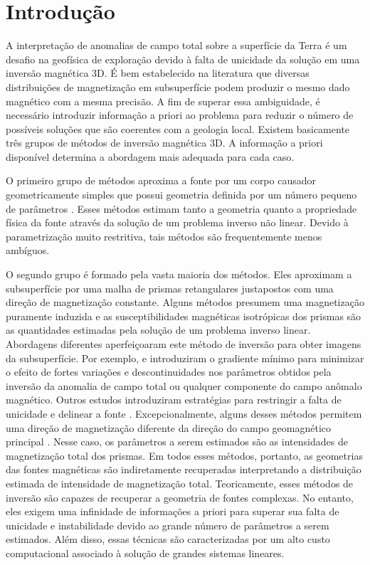 \chapter{Introdução}

A interpretação de anomalias de campo total sobre a superfície da Terra é um desafio na geofísica de exploração devido à falta de unicidade da solução em uma inversão magnética 3D. É bem estabelecido na literatura que diversas distribuições de magnetização em subsuperfície podem produzir o mesmo dado magnético com a mesma precisão. A fim de superar essa ambiguidade, é necessário introduzir informação a priori ao problema para reduzir o número de possíveis soluções que são coerentes com a geologia local. Existem basicamente três grupos de métodos de inversão magnética 3D. A informação a priori disponível determina a abordagem mais adequada para cada caso.

O primeiro grupo de métodos aproxima a fonte por um corpo causador geometricamente simples que possui geometria definida por um número pequeno de parâmetros \cite[por exemplo, ][]{ballantyne-1980,bhattacharyya-1980,silva_hohmann1983,medeiros_silva1995}. Esses métodos estimam tanto a geometria quanto a propriedade física da fonte através da solução de um problema inverso não linear. Devido à parametrização muito restritiva, tais métodos são frequentemente menos ambíguos.

O segundo grupo é formado pela vasta maioria dos métodos. Eles aproximam a subsuperfície por uma malha de prismas retangulares justapostos com uma direção de magnetização constante.
Alguns métodos presumem uma magnetização puramente induzida \cite[por exemplo, ][]{cribb-1976,li_3-d_1996,pilkington_3-d_1997} e as susceptibilidades magnéticas isotrópicas dos prismas são as quantidades estimadas pela solução de um problema inverso linear.
Abordagens diferentes aperfeiçoaram este método de inversão para obter imagens da subsuperfície.
Por exemplo, \cite{portniaguine_focusing_1999} e \cite{portniaguine_3d_2002} introduziram o gradiente mínimo para minimizar o efeito de fortes variações e descontinuidades nos parâmetros obtidos pela inversão da anomalia de campo total ou qualquer componente do campo anômalo magnético.
Outros estudos introduziram estratégias para restringir a falta de unicidade e delinear a fonte \cite[]{tontini,pilkington_3d_2009,shamsipour_3d_2011,cella_inversion_2012,abedi-2015}. Excepcionalmente, alguns desses métodos permitem uma direção de magnetização diferente da direção do campo geomagnético principal \cite[por exemplo, ][]{pignatelli-2006}. Nesse caso, os parâmetros a serem estimados são as intensidades de magnetização total dos prismas. Em todos esses métodos, portanto, as geometrias das fontes magnéticas são indiretamente recuperadas interpretando a distribuição estimada de intensidade de magnetização total. Teoricamente, esses métodos de inversão são capazes de recuperar a geometria de fontes complexas. No entanto, eles exigem uma infinidade de informações a priori para superar sua falta de unicidade e instabilidade devido ao grande número de parâmetros a serem estimados. Além disso, essas técnicas são caracterizadas por um alto custo computacional associado à solução de grandes sistemas lineares.


